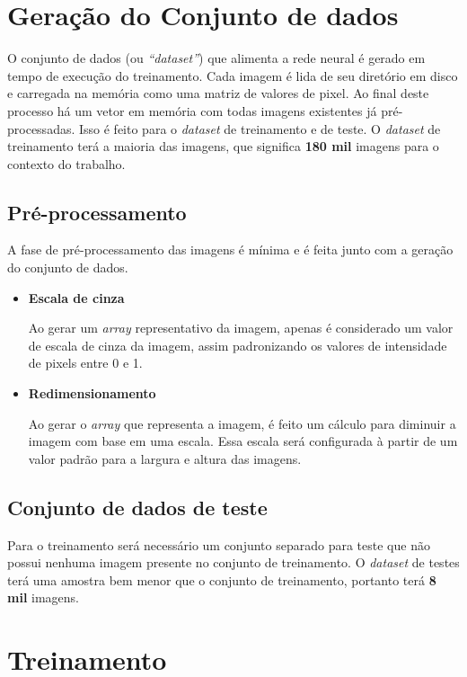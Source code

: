 \section{Geração do Conjunto de dados}

O conjunto de dados (ou \textit{``dataset''}) que alimenta a rede neural é
gerado em tempo de execução do treinamento. Cada imagem é lida de seu
diretório em disco e carregada na memória como uma matriz de valores
de pixel. Ao final deste processo há um vetor em memória com todas
imagens existentes já pré-processadas. Isso é feito para o \textit{dataset} de
treinamento e de teste. O \textit{dataset} de treinamento terá a maioria das
imagens, que significa {\bf 180 mil} imagens para o contexto do
trabalho.

\subsection{Pré-processamento}

A fase de pré-processamento das imagens é mínima e é feita junto com a
geração do conjunto de dados.

\begin{itemize}
\item{\bf Escala de cinza}

Ao gerar um \textit{array} representativo da imagem, apenas é
considerado um valor de escala de cinza da imagem, assim padronizando
os valores de intensidade de pixels entre 0 e 1.

\item{\bf Redimensionamento}

Ao gerar o \textit{array} que representa a imagem, é feito um cálculo
para diminuir a imagem com base em uma escala. Essa escala será
configurada à partir de um valor padrão para a largura e altura das
imagens. 

\end{itemize}

\subsection{Conjunto de dados de teste}

Para o treinamento será necessário um conjunto separado para teste que
não possui nenhuma imagem presente no conjunto de treinamento.
O \textit{dataset} de testes terá uma amostra bem menor que o conjunto de
treinamento, portanto terá {\bf 8 mil} imagens.

\section{Treinamento}

